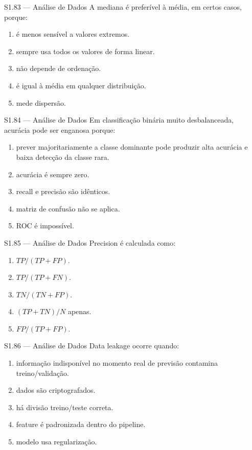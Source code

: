 \begin{questao}{S1.83 — Análise de Dados}
A mediana é preferível à média, em certos casos, porque:
\begin{enumerate}[label=\Alph*)]\item é menos sensível a valores extremos.\item sempre usa todos os valores de forma linear.\item não depende de ordenação.\item é igual à média em qualquer distribuição.\item mede dispersão.\end{enumerate}
\end{questao}

\begin{questao}{S1.84 — Análise de Dados}
Em classificação binária muito desbalanceada, acurácia pode ser enganosa porque:
\begin{enumerate}[label=\Alph*)]\item prever majoritariamente a classe dominante pode produzir alta acurácia e baixa detecção da classe rara.\item acurácia é sempre zero.\item recall e precisão são idênticos.\item matriz de confusão não se aplica.\item ROC é impossível.\end{enumerate}
\end{questao}

\begin{questao}{S1.85 — Análise de Dados}
Precision é calculada como:
\begin{enumerate}[label=\Alph*)]\item $TP/(TP+FP)$.\item $TP/(TP+FN)$.\item $TN/(TN+FP)$.\item $(TP+TN)/N$ apenas.\item $FP/(TP+FP)$.\end{enumerate}
\end{questao}

\begin{questao}{S1.86 — Análise de Dados}
Data leakage ocorre quando:
\begin{enumerate}[label=\Alph*)]\item informação indisponível no momento real de previsão contamina treino/validação.\item dados são criptografados.\item há divisão treino/teste correta.\item feature é padronizada dentro do pipeline.\item modelo usa regularização.\end{enumerate}
\end{questao}

